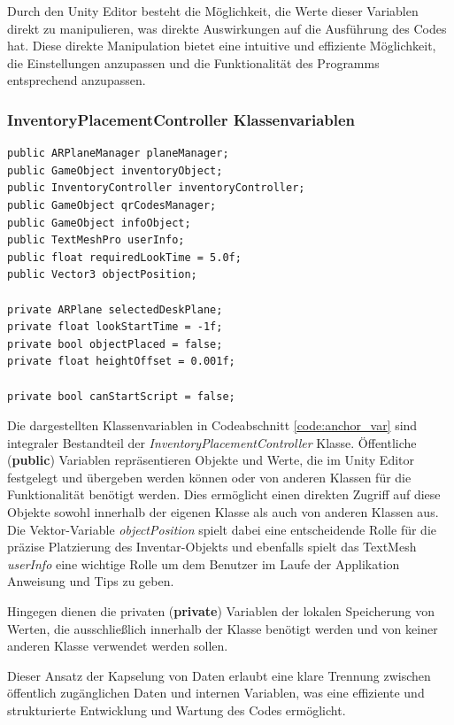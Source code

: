 Durch den Unity Editor besteht die Möglichkeit, die Werte dieser Variablen direkt zu manipulieren, was direkte Auswirkungen
auf die Ausführung des Codes hat. Diese direkte Manipulation bietet eine intuitive und effiziente Möglichkeit, die
Einstellungen anzupassen und die Funktionalität des Programms entsprechend anzupassen.

\subsubsection{InventoryPlacementController Klassenvariablen}
\begin{lstlisting}[style=csharp, caption={Klassenvariablen der InventoryPlacementController Klasse}, label=code:anchor_var]
public ARPlaneManager planeManager;
public GameObject inventoryObject;
public InventoryController inventoryController;
public GameObject qrCodesManager;
public GameObject infoObject;
public TextMeshPro userInfo;
public float requiredLookTime = 5.0f;
public Vector3 objectPosition;

private ARPlane selectedDeskPlane;
private float lookStartTime = -1f;
private bool objectPlaced = false;
private float heightOffset = 0.001f;

private bool canStartScript = false;
\end{lstlisting}

Die dargestellten Klassenvariablen in Codeabschnitt \ref{code:anchor_var} sind integraler Bestandteil der
\textit{InventoryPlacementController} Klasse. Öffentliche (\textbf{public}) Variablen repräsentieren Objekte und Werte,
die im Unity Editor festgelegt und übergeben werden können oder von anderen Klassen für die Funktionalität benötigt werden.
Dies ermöglicht einen direkten Zugriff auf diese Objekte sowohl innerhalb der eigenen Klasse als auch von anderen Klassen
aus. Die Vektor-Variable \textit{objectPosition} spielt dabei eine entscheidende Rolle für die präzise Platzierung des
Inventar-Objekts und ebenfalls spielt das TextMesh \textit{userInfo} eine wichtige Rolle um dem Benutzer im Laufe der
Applikation Anweisung und Tips zu geben.

Hingegen dienen die privaten (\textbf{private}) Variablen der lokalen Speicherung von Werten, die ausschließlich innerhalb
der Klasse benötigt werden und von keiner anderen Klasse verwendet werden sollen.

Dieser Ansatz der Kapselung von Daten erlaubt eine klare Trennung zwischen öffentlich zugänglichen Daten und internen
Variablen, was eine effiziente und strukturierte Entwicklung und Wartung des Codes ermöglicht.
